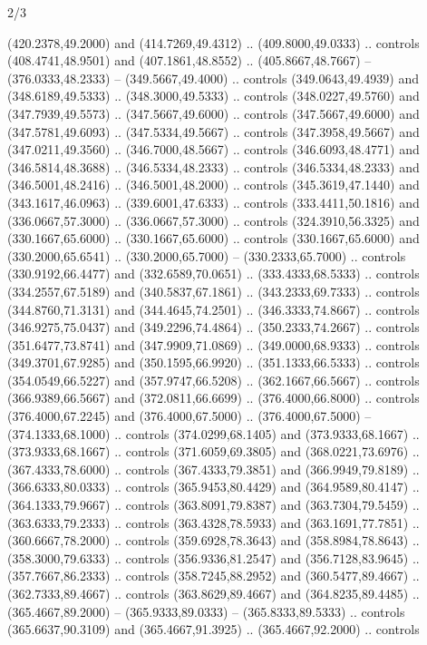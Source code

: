 \begin{flagdescription}{2/3}
\begin{scope}[xshift=0.5\flaglength,yshift=0.5\flagwidth,scale=\flagwidth/525.28]
\begin{scope}[y=0.1mm, x=0.1mm, yscale=-1,shift={(-381.5,-404)}]
\begin{scope}[shift={(5.25001,4.53053)},miter limit=4.00,line width=0.800\lw]
  (420.2378,49.2000) and (414.7269,49.4312) .. (409.8000,49.0333) .. controls
  (408.4741,48.9501) and (407.1861,48.8552) .. (405.8667,48.7667) --
  (376.0333,48.2333) -- (349.5667,49.4000) .. controls (349.0643,49.4939) and
  (348.6189,49.5333) .. (348.3000,49.5333) .. controls (348.0227,49.5760) and
  (347.7939,49.5573) .. (347.5667,49.6000) .. controls (347.5667,49.6000) and
  (347.5781,49.6093) .. (347.5334,49.5667) .. controls (347.3958,49.5667) and
  (347.0211,49.3560) .. (346.7000,48.5667) .. controls (346.6093,48.4771) and
  (346.5814,48.3688) .. (346.5334,48.2333) .. controls (346.5334,48.2333) and
  (346.5001,48.2416) .. (346.5001,48.2000) .. controls (345.3619,47.1440) and
  (343.1617,46.0963) .. (339.6001,47.6333) .. controls (333.4411,50.1816) and
  (336.0667,57.3000) .. (336.0667,57.3000) .. controls (324.3910,56.3325) and
  (330.1667,65.6000) .. (330.1667,65.6000) .. controls (330.1667,65.6000) and
  (330.2000,65.6541) .. (330.2000,65.7000) -- (330.2333,65.7000) .. controls
  (330.9192,66.4477) and (332.6589,70.0651) .. (333.4333,68.5333) .. controls
  (334.2557,67.5189) and (340.5837,67.1861) .. (343.2333,69.7333) .. controls
  (344.8760,71.3131) and (344.4645,74.2501) .. (346.3333,74.8667) .. controls
  (346.9275,75.0437) and (349.2296,74.4864) .. (350.2333,74.2667) .. controls
  (351.6477,73.8741) and (347.9909,71.0869) .. (349.0000,68.9333) .. controls
  (349.3701,67.9285) and (350.1595,66.9920) .. (351.1333,66.5333) .. controls
  (354.0549,66.5227) and (357.9747,66.5208) .. (362.1667,66.5667) .. controls
  (366.9389,66.5667) and (372.0811,66.6699) .. (376.4000,66.8000) .. controls
  (376.4000,67.2245) and (376.4000,67.5000) .. (376.4000,67.5000) --
  (374.1333,68.1000) .. controls (374.0299,68.1405) and (373.9333,68.1667) ..
  (373.9333,68.1667) .. controls (371.6059,69.3805) and (368.0221,73.6976) ..
  (367.4333,78.6000) .. controls (367.4333,79.3851) and (366.9949,79.8189) ..
  (366.6333,80.0333) .. controls (365.9453,80.4429) and (364.9589,80.4147) ..
  (364.1333,79.9667) .. controls (363.8091,79.8387) and (363.7304,79.5459) ..
  (363.6333,79.2333) .. controls (363.4328,78.5933) and (363.1691,77.7851) ..
  (360.6667,78.2000) .. controls (359.6928,78.3643) and (358.8984,78.8643) ..
  (358.3000,79.6333) .. controls (356.9336,81.2547) and (356.7128,83.9645) ..
  (357.7667,86.2333) .. controls (358.7245,88.2952) and (360.5477,89.4667) ..
  (362.7333,89.4667) .. controls (363.8629,89.4667) and (364.8235,89.4485) ..
  (365.4667,89.2000) -- (365.9333,89.0333) -- (365.8333,89.5333) .. controls
  (365.6637,90.3109) and (365.4667,91.3925) .. (365.4667,92.2000) .. controls

\end{scope}
\end{scope}
\end{scope}
\end{flagdescription}
